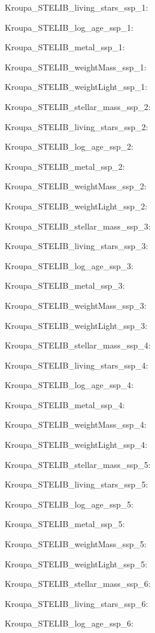\item Kroupa\_STELIB\_living\_stars\_ssp\_1: 
\item Kroupa\_STELIB\_log\_age\_ssp\_1: 
\item Kroupa\_STELIB\_metal\_ssp\_1: 
\item Kroupa\_STELIB\_weightMass\_ssp\_1: 
\item Kroupa\_STELIB\_weightLight\_ssp\_1: 
\item Kroupa\_STELIB\_stellar\_mass\_ssp\_2: 
\item Kroupa\_STELIB\_living\_stars\_ssp\_2: 
\item Kroupa\_STELIB\_log\_age\_ssp\_2: 
\item Kroupa\_STELIB\_metal\_ssp\_2: 
\item Kroupa\_STELIB\_weightMass\_ssp\_2: 
\item Kroupa\_STELIB\_weightLight\_ssp\_2: 
\item Kroupa\_STELIB\_stellar\_mass\_ssp\_3: 
\item Kroupa\_STELIB\_living\_stars\_ssp\_3: 
\item Kroupa\_STELIB\_log\_age\_ssp\_3: 
\item Kroupa\_STELIB\_metal\_ssp\_3: 
\item Kroupa\_STELIB\_weightMass\_ssp\_3: 
\item Kroupa\_STELIB\_weightLight\_ssp\_3: 
\item Kroupa\_STELIB\_stellar\_mass\_ssp\_4: 
\item Kroupa\_STELIB\_living\_stars\_ssp\_4: 
\item Kroupa\_STELIB\_log\_age\_ssp\_4: 
\item Kroupa\_STELIB\_metal\_ssp\_4: 
\item Kroupa\_STELIB\_weightMass\_ssp\_4: 
\item Kroupa\_STELIB\_weightLight\_ssp\_4: 
\item Kroupa\_STELIB\_stellar\_mass\_ssp\_5: 
\item Kroupa\_STELIB\_living\_stars\_ssp\_5: 
\item Kroupa\_STELIB\_log\_age\_ssp\_5: 
\item Kroupa\_STELIB\_metal\_ssp\_5: 
\item Kroupa\_STELIB\_weightMass\_ssp\_5: 
\item Kroupa\_STELIB\_weightLight\_ssp\_5: 
\item Kroupa\_STELIB\_stellar\_mass\_ssp\_6: 
\item Kroupa\_STELIB\_living\_stars\_ssp\_6: 
\item Kroupa\_STELIB\_log\_age\_ssp\_6: 
